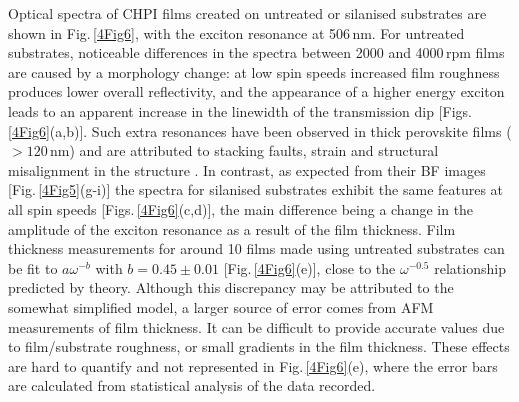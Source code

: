 Optical spectra of CHPI films created on untreated or silanised substrates are shown in Fig.\,\ref{4Fig6}, with the exciton resonance at 506\,nm. For untreated substrates, noticeable differences in the spectra between 2000 and 4000\,rpm films are caused by a morphology change: at low spin speeds increased film roughness produces lower overall reflectivity, and the appearance of a higher energy exciton leads to an apparent increase in the linewidth of the transmission dip [Figs.\,\ref{4Fig6}(a,b)]. Such extra resonances have been observed in thick perovskite films ($>120$\,nm) and are attributed to stacking faults, strain and structural misalignment in the structure \cite{VijayaPrakash2009}. In contrast, as expected from their BF images [Fig.\,\ref{4Fig5}(g-i)] the spectra for silanised substrates exhibit the same features at all spin speeds [Figs.\,\ref{4Fig6}(c,d)], the main difference being a change in the amplitude of the exciton resonance as a result of the film thickness. Film thickness measurements for around 10 films made using untreated substrates can be fit to $a\omega^{-b}$ with $b=0.45\pm0.01$ [Fig.\,\ref{4Fig6}(e)], close to the $\omega^{-0.5}$ relationship predicted by theory. Although this discrepancy may be attributed to the somewhat simplified model, a larger source of error comes from AFM measurements of film thickness. It can be difficult to provide accurate values due to film/substrate roughness, or small gradients in the film thickness. These effects are hard to quantify and not represented in Fig.\,\ref{4Fig6}(e), where the error bars are calculated from statistical analysis of the data recorded.

